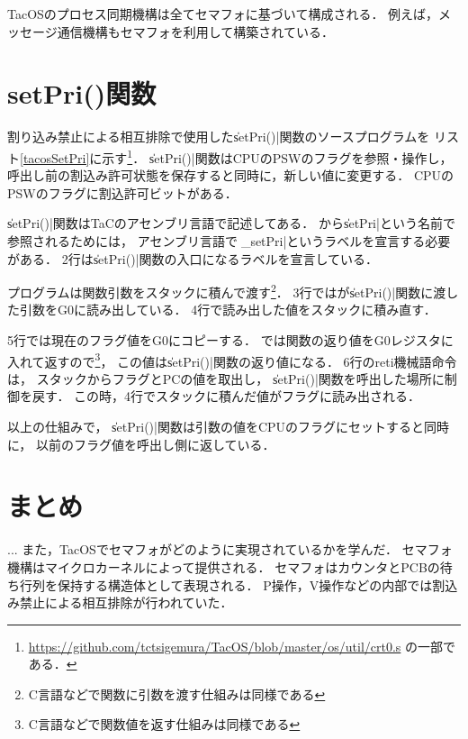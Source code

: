 TacOSのプロセス同期機構は全てセマフォに基づいて構成される．
例えば，メッセージ通信機構もセマフォを利用して構築されている．

\section{setPri()関数}
\label{setPri}
割り込み禁止による相互排除で使用した\|setPri()|関数のソースプログラムを
リスト\ref{tacosSetPri}に示す\footnote{
  \url{https://github.com/tctsigemura/TacOS/blob/master/os/util/crt0.s}
  の一部である．}．
\|setPri()|関数はCPUのPSWのフラグを参照・操作し，
呼出し前の割込み許可状態を保存すると同時に，新しい値に変更する．
CPUのPSWのフラグに割込許可ビットがある．



\|setPri()|関数はTaCのアセンブリ言語で記述してある．
{\cmml}から\|setPri|という名前で参照されるためには，
アセンブリ言語では\|_setPri|というラベルを宣言する必要がある．
2行は\|setPri()|関数の入口になるラベルを宣言している．

{\cmml}プログラムは関数引数をスタックに積んで渡す\footnote{
  C言語などで関数に引数を渡す仕組みは同様である}．
3行では{\cmml}が\|setPri()|関数に渡した引数をG0に読み出している．
4行で読み出した値をスタックに積み直す．

5行では現在のフラグ値をG0にコピーする．
{\cmml}では関数の返り値をG0レジスタに入れて返すので\footnote{
  C言語などで関数値を返す仕組みは同様である}，
この値は\|setPri()|関数の返り値になる．
6行のreti機械語命令は，
スタックからフラグとPCの値を取出し，
\|setPri()|関数を呼出した場所に制御を戻す．
この時，4行でスタックに積んだ値がフラグに読み出される．

以上の仕組みで，
\|setPri()|関数は引数の値をCPUのフラグにセットすると同時に，
以前のフラグ値を呼出し側に返している．


\section{まとめ}

...
また，TacOSでセマフォがどのように実現されているかを学んだ．
セマフォ機構はマイクロカーネルによって提供される．
セマフォはカウンタとPCBの待ち行列を保持する構造体として表現される．
P操作，V操作などの内部では割込み禁止による相互排除が行われていた．

